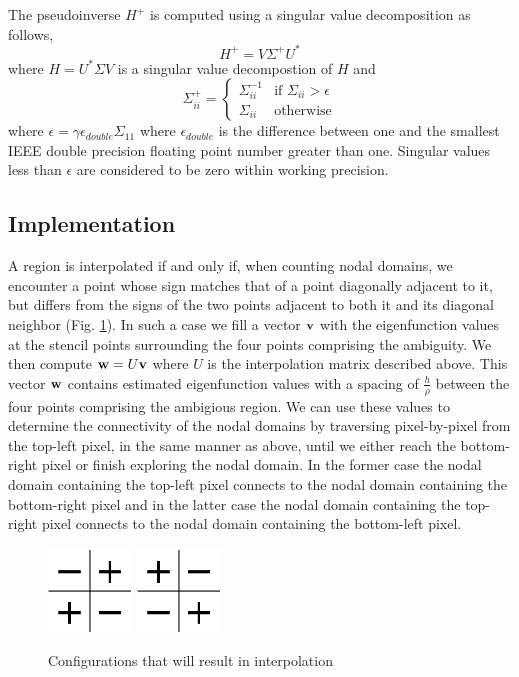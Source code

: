 \documentclass{report}
\begin{document}
The pseudoinverse $H^{+}$ is computed using a singular value decomposition as follows,
\[
H^{+} = V \Sigma^{+} U^{*}
\]
where $H = U^{*} \Sigma V$ is a singular value decompostion of $H$ and
\[
\Sigma^{+}_{ii} =\begin{cases}
\Sigma_{ii}^{-1} & \text{if }\Sigma_{ii} > \epsilon\\
\Sigma_{ii} & \text{otherwise}
\end{cases}
\]
where $\epsilon = \gamma \epsilon_{double} \Sigma_{11}$ where $\epsilon_{double}$ is the difference between one and the smallest IEEE double precision floating point number greater than one. Singular values less than $\epsilon$ are considered to be zero within working precision.

\subsection{Implementation}
A region is interpolated if and only if, when counting nodal domains, we encounter a point whose sign matches that of a point diagonally adjacent to it, but differs from the signs of the two points adjacent to both it and its diagonal neighbor (Fig. \ref{fig:trouble_spot}). In such a case we fill a vector ${\bf v}$ with the eigenfunction values at the stencil points surrounding the four points comprising the ambiguity. We then compute ${\bf w} = U {\bf v}$ where $U$ is the interpolation matrix described above. This vector ${\bf w}$ contains estimated eigenfunction values with a spacing of $\frac{h}{\rho}$ between the four points comprising the ambigious region. We can use these values to determine the connectivity of the nodal domains by traversing pixel-by-pixel from the top-left pixel, in the same manner as above, until we either reach the bottom-right pixel or finish exploring the nodal domain. In the former case the nodal domain containing the top-left pixel connects to the nodal domain containing the bottom-right pixel and in the latter case the nodal domain containing the top-right pixel connects to the nodal domain containing the bottom-left pixel.

\begin{figure}
  \begin{center}
    \includegraphics[width=0.2\textwidth]{figs/interpolation/trouble_spot1.eps}
    \hspace{1 cm} 
    \includegraphics[width=0.2\textwidth]{figs/interpolation/trouble_spot2.eps}
    \caption{Configurations that will result in interpolation}
    \label{fig:trouble_spot}
  \end{center}
\end{figure}
\end{document}
